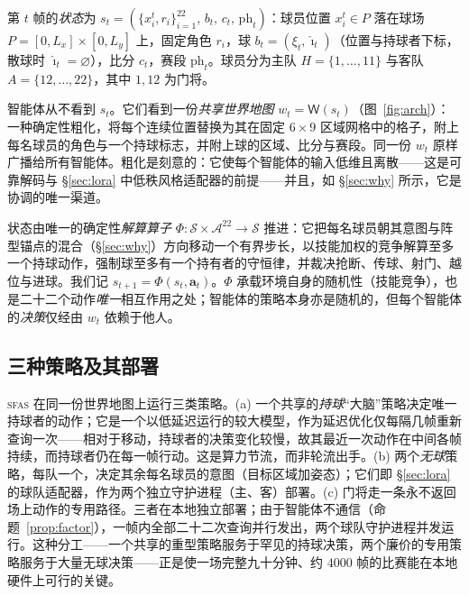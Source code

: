 \documentclass[11pt,UTF8,fontset=fandol]{ctexart}
\newcommand{\Sphere}{\mathcal{S}}
\newcommand{\Aspace}{\mathcal{A}}
\newcommand{\Wmap}{\mathsf{W}}
\newcommand{\sfas}{\textsc{sfas}}
\theoremstyle{plain}
\theoremstyle{definition}
\theoremstyle{remark}
\begin{document}
第 $t$ 帧的\emph{状态}为 $s_t=(\{x_i^t,r_i\}_{i=1}^{22},\,b_t,\,c_t,\,\text{ph}_t)$：球员位置 $x_i^t\in P$ 落在球场 $P=[0,L_x]\times[0,L_y]$ 上，固定角色 $r_i$，球 $b_t=(\xi_t,\hat\imath_t)$（位置与持球者下标，散球时 $\hat\imath_t=\varnothing$），比分 $c_t$，赛段 $\text{ph}_t$。球员分为主队 $H=\{1,\dots,11\}$ 与客队 $A=\{12,\dots,22\}$，其中 $1,12$ 为门将。

智能体从不看到 $s_t$。它们看到一份\emph{共享世界地图} $w_t=\Wmap(s_t)$（图~\ref{fig:arch}）：一种确定性粗化，将每个连续位置替换为其在固定 $6\times9$ 区域网格中的格子，附上每名球员的角色与一个持球标志，并附上球的区域、比分与赛段。同一份 $w_t$ 原样广播给所有智能体。粗化是刻意的：它使每个智能体的输入低维且离散——这是可靠解码与 \S\ref{sec:lora} 中低秩风格适配器的前提——并且，如 \S\ref{sec:why} 所示，它是协调的唯一渠道。

状态由唯一的确定性\emph{解算算子} $\Phi:\Sphere\times\Aspace^{22}\to\Sphere$ 推进：它把每名球员朝其意图与阵型锚点的混合（\S\ref{sec:why}）方向移动一个有界步长，以技能加权的竞争解算至多一个持球动作，强制球至多有一个持有者的守恒律，并裁决抢断、传球、射门、越位与进球。我们记 $s_{t+1}=\Phi(s_t,\mathbf a_t)$。$\Phi$ 承载环境自身的随机性（技能竞争），也是二十二个动作\emph{唯一}相互作用之处；智能体的策略本身亦是随机的，但每个智能体的\emph{决策}仅经由 $w_t$ 依赖于他人。

\subsection{三种策略及其部署}\label{sec:serve}

\sfas{} 在同一份世界地图上运行三类策略。(a) 一个共享的\emph{持球}“大脑”策略决定唯一持球者的动作；它是一个以低延迟运行的较大模型，作为延迟优化仅每隔几帧重新查询一次——相对于移动，持球者的决策变化较慢，故其最近一次动作在中间各帧持续，而持球者仍在每一帧行动。这是算力节流，而非轮流出手。(b) 两个\emph{无球}策略，每队一个，决定其余每名球员的意图（目标区域加姿态）；它们即 \S\ref{sec:lora} 的球队适配器，作为两个独立守护进程（主、客）部署。(c) 门将走一条永不返回场上动作的专用路径。三者在本地独立部署；由于智能体不通信（命题~\ref{prop:factor}），一帧内全部二十二次查询并行发出，两个球队守护进程并发运行。这种分工——一个共享的重型策略服务于罕见的持球决策，两个廉价的专用策略服务于大量无球决策——正是使一场完整九十分钟、约 $4000$ 帧的比赛能在本地硬件上可行的关键。
\end{document}
